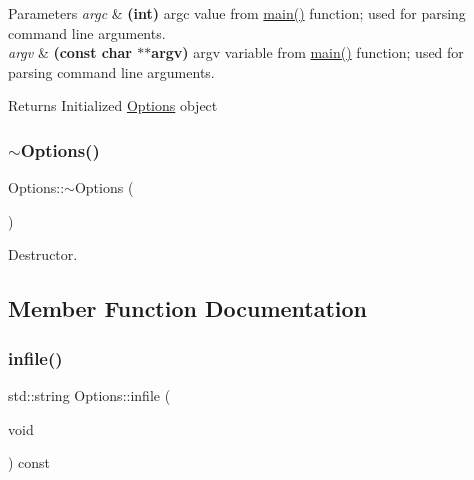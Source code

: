 \begin{DoxyParams}{Parameters}
{\em argc} & {\bfseries (int)} argc value from \mbox{\hyperlink{main_8cpp_ac0f2228420376f4db7e1274f2b41667c}{main()}} function; used for parsing command line arguments. \\
\hline
{\em argv} & {\bfseries (const char $\ast$$\ast$argv)} argv variable from \mbox{\hyperlink{main_8cpp_ac0f2228420376f4db7e1274f2b41667c}{main()}} function; used for parsing command line arguments. \\
\hline
\end{DoxyParams}
\begin{DoxyReturn}{Returns}
Initialized \mbox{\hyperlink{class_options}{Options}} object 
\end{DoxyReturn}
\mbox{\label{class_options_a86ddb85b183f8b58af5481f30a42fa92}} 
\subsubsection{\texorpdfstring{$\sim$\+Options()}{~Options()}}
{\footnotesize\ttfamily Options\+::$\sim$\+Options (\begin{DoxyParamCaption}{ }\end{DoxyParamCaption})}



Destructor. 



\subsection{Member Function Documentation}
\mbox{\label{class_options_af5fc0ecb4b117c5438f07762fa7f565a}} 
\subsubsection{\texorpdfstring{infile()}{infile()}}
{\footnotesize\ttfamily std\+::string Options\+::infile (\begin{DoxyParamCaption}\item[{void}]{ }\end{DoxyParamCaption}) const\hspace{0.3cm}{\ttfamily [inline]}}



